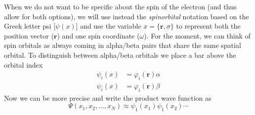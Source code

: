 \documentclass[../Main/chem371-notes.tex]{subfiles}
\begin{document}
When we do not want to be specific about the spin of the electron (and thus allow for both options), we will use instead the \emph{spinorbital} notation based on the Greek letter psi [$\psi(x)$] and use the variable $x = \{ \mathbf{r},\sigma\}$ to represent both the position vector ($\mathbf{r}$) and one spin coordinate ($\omega$).
For the moment, we can think of spin orbitals as always coming in alpha/beta pairs that share the same spatial orbital. To distinguish between alpha/beta orbitals we place a bar above the orbital index
\begin{align}
\psi_i(x) & = \varphi_i(\mathbf{r}) \alpha \\
\psi_{\bar{i}}(x) & = \varphi_i(\mathbf{r}) \beta
\end{align}
Now we can be more precise and write the product wave function as
\begin{equation}
\label{eq:hartree_prod_spin}
\Psi(x_1, x_2, \ldots, x_N) \approx \psi_1(x_1) \psi_{\bar{1}}(x_2) \cdots
\end{equation}
\end{document}
